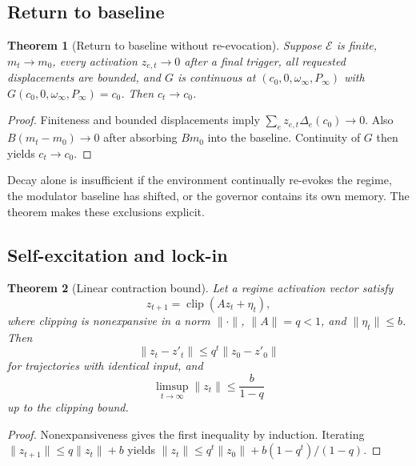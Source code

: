 \documentclass[11pt]{article}
\newtheorem{theorem}{Theorem}
\newcommand{\clip}{\operatorname{clip}}
\begin{document}
\subsection{Return to baseline}

\begin{theorem}[Return to baseline without re-evocation]
\label{thm:baseline}
Suppose $\mathcal{E}$ is finite, $m_t\to m_0$, every activation $z_{e,t}\to0$
after a final trigger, all requested displacements are bounded, and $G$ is
continuous at $(c_0,0,\omega_\infty,P_\infty)$ with
$G(c_0,0,\omega_\infty,P_\infty)=c_0$.  Then $c_t\to c_0$.
\end{theorem}

\begin{proof}
Finiteness and bounded displacements imply
$\sum_e z_{e,t}\Delta_e(c_0)\to0$.  Also $B(m_t-m_0)\to0$ after absorbing
$Bm_0$ into the baseline.  Continuity of $G$ then yields $c_t\to c_0$.
\end{proof}

Decay alone is insufficient if the environment continually re-evokes the
regime, the modulator baseline has shifted, or the governor contains its own
memory.  The theorem makes these exclusions explicit.

\subsection{Self-excitation and lock-in}

\begin{theorem}[Linear contraction bound]
\label{thm:contraction}
Let a regime activation vector satisfy
\begin{equation}
z_{t+1}=\clip(Az_t+\eta_t),
\end{equation}
where clipping is nonexpansive in a norm $\|\cdot\|$, $\|A\|=q<1$, and
$\|\eta_t\|\le b$.  Then
\begin{equation}
\|z_t-z'_t\|\le q^t\|z_0-z'_0\|
\end{equation}
for trajectories with identical input, and
\begin{equation}
\limsup_{t\to\infty}\|z_t\|\le \frac{b}{1-q}
\end{equation}
up to the clipping bound.
\end{theorem}

\begin{proof}
Nonexpansiveness gives the first inequality by induction.  Iterating
$\|z_{t+1}\|\le q\|z_t\|+b$ yields
$\|z_t\|\le q^t\|z_0\|+b(1-q^t)/(1-q)$.
\end{proof}
\end{document}
